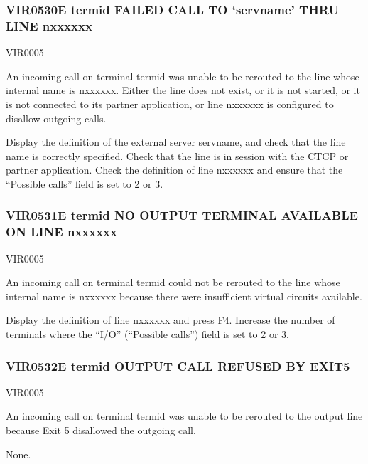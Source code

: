 \documentclass[letterpaper,10pt,english]{sphinxmanual}
\begin{document}
\subsubsection{VIR0530E termid FAILED CALL TO ‘servname’ THRU LINE n\sphinxhyphen{}xxxxxx}
\label{\detokenize{messages:vir0530e-termid-failed-call-to-servname-thru-line-n-xxxxxx}}\begin{description}
\sphinxAtStartPar
VIR0005

\sphinxAtStartPar
An incoming call on terminal termid was unable to be rerouted to the line whose internal name is n\sphinxhyphen{}xxxxxx. Either the line does not exist, or it is not started, or it is not connected to its partner application, or line n\sphinxhyphen{}xxxxxx is configured to disallow outgoing calls.

\sphinxAtStartPar
Display the definition of the external server servname, and check that the line name is correctly specified. Check that the line is in session with the CTCP or partner application. Check the definition of line n\sphinxhyphen{}xxxxxx and ensure that the “Possible calls” field is set to 2 or 3.

\end{description}


\subsubsection{VIR0531E termid NO OUTPUT TERMINAL AVAILABLE ON LINE n\sphinxhyphen{}xxxxxx}
\label{\detokenize{messages:vir0531e-termid-no-output-terminal-available-on-line-n-xxxxxx}}\begin{description}
\sphinxAtStartPar
VIR0005

\sphinxAtStartPar
An incoming call on terminal termid could not be rerouted to the line whose internal name is n\sphinxhyphen{}xxxxxx because there were insufficient virtual circuits available.

\sphinxAtStartPar
Display the definition of line n\sphinxhyphen{}xxxxxx and press F4. Increase the number of terminals where the “I/O” (“Possible calls”) field is set to 2 or 3.

\end{description}


\subsubsection{VIR0532E termid OUTPUT CALL REFUSED BY EXIT5}
\label{\detokenize{messages:vir0532e-termid-output-call-refused-by-exit5}}\begin{description}
\sphinxAtStartPar
VIR0005

\sphinxAtStartPar
An incoming call on terminal termid was unable to be rerouted to the output line because Exit 5 disallowed the outgoing call.

\sphinxAtStartPar
None.

\end{description}
\end{document}
